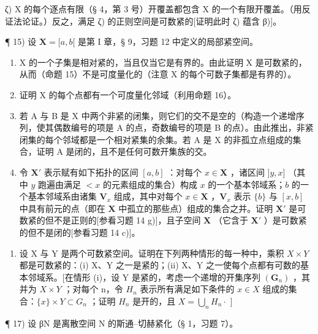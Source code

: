 ζ) X 的每个逐点有限（§ 4，第 3 号）开覆盖都包含 X 的一个有限开覆盖。（用反证法论证。）反之，满足 ζ) 的正则空间是可数紧的{[}证明此时 ζ) 蕴含 β){]}。

¶ 15) 设 \(\mathbf{X} = [a, b[\) 是第 I 章，§ 9，习题 12 中定义的局部紧空间。

\begin{enumerate}
\def\labelenumi{\alph{enumi})}
\item
  X 的一个子集是相对紧的，当且仅当它是有界的。由此证明 X 是可数紧的，从而（命题 15）不是可度量化的（注意 X 的每个可数子集都是有界的）。
\item
  证明 X 的每个点都有一个可度量化邻域（利用命题 16）。
\item
  若 A 与 B 是 X 中两个非紧的闭集，则它们的交不是空的（构造一个递增序列，使其偶数编号的项是 A 的点，奇数编号的项是 B 的点）。由此推出，非紧闭集的每个邻域都是一个相对紧集的余集。若 A 是 X 的非孤立点组成的集合，证明 A 是闭的，且不是任何可数开集族的交。
\item
  令 \(\mathbf{X}'\) 表示赋有如下拓扑的区间 \([a, b]\) ：对每个 \(x \in \mathbf{X}\) ，诸区间 \(]y, x]\) （其中 \(y\) 跑遍由满足 \(< x\) 的元素组成的集合）构成 \(x\) 的一个基本邻域系；\(b\) 的一个基本邻域系由诸集 \(\mathbf{V}_x\) 组成，其中对每个 \(x \in \mathbf{X}\) ，\(\mathbf{V}_x\) 表示 \(\{b\}\) 与 \([x, b]\) 中具有前元的点（即在 \(\mathbf{X}\) 中孤立的那些点）组成的集合之并。证明 \(\mathbf{X}'\) 是可数紧的但不是正则的{[}参看习题 14 g){]}，且子空间 \(\mathbf{X}\) （它含于 \(\mathbf{X}'\) ）是可数紧的但不是闭的{[}参看习题 14 c){]}。
\end{enumerate}

\begin{enumerate}
\def\labelenumi{\arabic{enumi})}
\setcounter{enumi}{15}
\tightlist
\item
  设 X 与 Y 是两个可数紧空间。证明在下列两种情形的每一种中，乘积 \(X \times Y\) 都是可数紧的：(i) X、Y 之一是紧的；(ii) X、Y 之一使每个点都有可数的基本邻域系。{[}在情形 (i)，设 Y 是紧的，考虑一个递增的开集序列 \((\mathbf{G}_{n})\) ，其并为 \(X \times Y\) ；对每个 n，令 \(H_{n}\) 表示所有满足如下条件的 \(x \in X\) 组成的集合：\(\{x\} \times Y \subset G_{n}\) ；证明 \(H_{n}\) 是开的，且 \(X = \bigcup_{n} H_{n} \cdot\) {]}
\end{enumerate}

¶ 17) 设 βN 是离散空间 N 的斯通–切赫紧化（§ 1，习题 7）。

